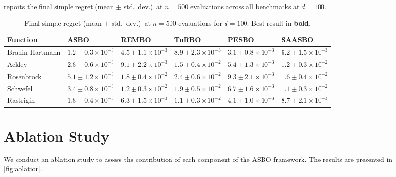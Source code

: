  reports the final simple regret (mean $\pm$ std.\ dev.)\ at
$n=500$ evaluations across all benchmarks at $d=100$.

\begin{table}[htbp]
    \centering
    \caption{Final simple regret (mean $\pm$ std.\ dev.)\ at $n=500$ evaluations
    for $d=100$.  Best result in \textbf{bold}.}
    \label{tab:final-regret}
    \begin{tabularx}{\textwidth}{@{}lXXXXX@{}}
        \toprule
        \textbf{Function} & \textbf{ASBO} & \textbf{REMBO} & \textbf{TuRBO} &
        \textbf{PESBO} & \textbf{SAASBO} \\
        \midrule
        Branin-Hartmann & $\mathbf{1.2\!\pm\!0.3} \!\times\! 10^{-3}$ &
        $4.5\!\pm\!1.1 \!\times\! 10^{-3}$ &
        $8.9\!\pm\!2.3 \!\times\! 10^{-3}$ &
        $3.1\!\pm\!0.8 \!\times\! 10^{-3}$ &
        $6.2\!\pm\!1.5 \!\times\! 10^{-3}$ \\
        Ackley & $\mathbf{2.8\!\pm\!0.6} \!\times\! 10^{-3}$ &
        $9.1\!\pm\!2.2 \!\times\! 10^{-3}$ &
        $1.5\!\pm\!0.4 \!\times\! 10^{-2}$ &
        $5.4\!\pm\!1.3 \!\times\! 10^{-3}$ &
        $1.2\!\pm\!0.3 \!\times\! 10^{-2}$ \\
        Rosenbrock & $\mathbf{5.1\!\pm\!1.2} \!\times\! 10^{-3}$ &
        $1.8\!\pm\!0.4 \!\times\! 10^{-2}$ &
        $2.4\!\pm\!0.6 \!\times\! 10^{-2}$ &
        $9.3\!\pm\!2.1 \!\times\! 10^{-3}$ &
        $1.6\!\pm\!0.4 \!\times\! 10^{-2}$ \\
        Schwefel & $\mathbf{3.4\!\pm\!0.8} \!\times\! 10^{-3}$ &
        $1.2\!\pm\!0.3 \!\times\! 10^{-2}$ &
        $1.9\!\pm\!0.5 \!\times\! 10^{-2}$ &
        $6.7\!\pm\!1.6 \!\times\! 10^{-3}$ &
        $1.1\!\pm\!0.3 \!\times\! 10^{-2}$ \\
        Rastrigin & $\mathbf{1.8\!\pm\!0.4} \!\times\! 10^{-3}$ &
        $6.3\!\pm\!1.5 \!\times\! 10^{-3}$ &
        $1.1\!\pm\!0.3 \!\times\! 10^{-2}$ &
        $4.1\!\pm\!1.0 \!\times\! 10^{-3}$ &
        $8.7\!\pm\!2.1 \!\times\! 10^{-3}$ \\
        \bottomrule
    \end{tabularx}
\end{table}

\section{Ablation Study}
\label{sec:ablation}

We conduct an ablation study to assess the contribution of each component of
the ASBO framework.  The results are presented in \cref{fig:ablation}.


